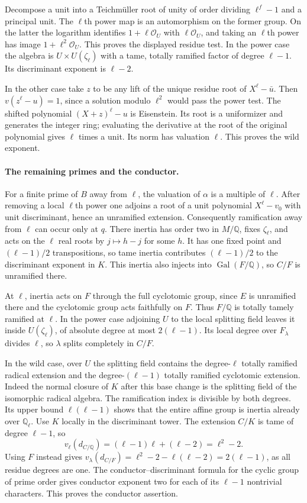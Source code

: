 Decompose a unit into a Teichm\"uller root of unity of order dividing $\ell^f-1$ and a principal unit. The $\ell$th power map is an automorphism on the former group. On the latter the logarithm identifies $1+\ell\mathcal O_U$ with $\ell\mathcal O_U$, and taking an $\ell$th power has image $1+\ell^2\mathcal O_U$. This proves the displayed residue test. In the power case the algebra is $U\times U(\zeta_\ell)$ with a tame, totally ramified factor of degree $\ell-1$. Its discriminant exponent is $\ell-2$.

In the other case take $z$ to be any lift of the unique residue root of $X^\ell-\bar u$. Then $v(z^\ell-u)=1$, since a solution modulo $\ell^2$ would pass the power test. The shifted polynomial $(X+z)^\ell-u$ is Eisenstein. Its root is a uniformizer and generates the integer ring; evaluating the derivative at the root of the original polynomial gives $\ell$ times a unit. Its norm has valuation $\ell$. This proves the wild exponent.

\paragraph{The remaining primes and the conductor.}
For a finite prime of $B$ away from $\ell$, the valuation of $\alpha$ is a multiple of $\ell$. After removing a local $\ell$th power one adjoins a root of a unit polynomial $X^\ell-v_0$ with unit discriminant, hence an unramified extension. Consequently ramification away from $\ell$ can occur only at $q$. There inertia has order two in $M/\mathbb Q$, fixes $\zeta_\ell$, and acts on the $\ell$ real roots by $j\mapsto h-j$ for some $h$. It has one fixed point and $(\ell-1)/2$ transpositions, so tame inertia contributes $(\ell-1)/2$ to the discriminant exponent in $K$. This inertia also injects into $\operatorname{Gal}(F/\mathbb Q)$, so $C/F$ is unramified there.

At $\ell$, inertia acts on $F$ through the full cyclotomic group, since $E$ is unramified there and the cyclotomic group acts faithfully on $F$. Thus $F/\mathbb Q$ is totally tamely ramified at $\ell$. In the power case adjoining $U$ to the local splitting field leaves it inside $U(\zeta_\ell)$, of absolute degree at most $2(\ell-1)$. Its local degree over $F_\lambda$ divides $\ell$, so $\lambda$ splits completely in $C/F$.

In the wild case, over $U$ the splitting field contains the degree-$\ell$ totally ramified radical extension and the degree-$(\ell-1)$ totally ramified cyclotomic extension. Indeed the normal closure of $K$ after this base change is the splitting field of the isomorphic radical algebra. The ramification index is divisible by both degrees. Its upper bound $\ell(\ell-1)$ shows that the entire affine group is inertia already over $\mathbb Q_\ell$. Use $K$ locally in the discriminant tower. The extension $C/K$ is tame of degree $\ell-1$, so
\[
 v_\ell(d_{C/\mathbb Q})=(\ell-1)\ell+(\ell-2)=\ell^2-2.
\]
Using $F$ instead gives $v_\lambda(d_{C/F})=\ell^2-2-\ell(\ell-2)=2(\ell-1)$, as all residue degrees are one. The conductor--discriminant formula for the cyclic group of prime order gives conductor exponent two for each of its $\ell-1$ nontrivial characters. This proves the conductor assertion.


